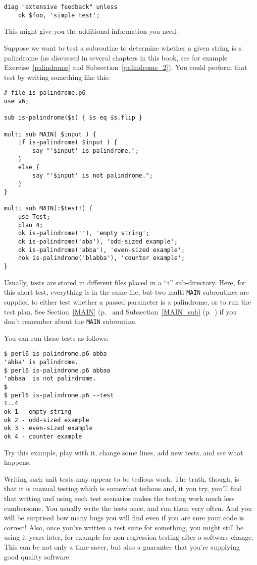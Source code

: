 \begin{verbatim}
diag "extensive feedback" unless
    ok $foo, 'simple test';
\end{verbatim}

This might give you the additional information you need.

Suppose we want to test a subroutine to determine whether a 
given string is a palindrome (as discussed in several chapters 
in this book, see for example Exercise~\ref{palindrome} and 
Subsection~\ref{palindrome_2}). You could perform that test 
by writing something like this:

\begin{verbatim}
# file is-palindrome.p6
use v6;

sub is-palindrome($s) { $s eq $s.flip }

multi sub MAIN( $input ) {
    if is-palindrome( $input ) {
        say "'$input' is palindrome.";
    }
    else {
        say "'$input' is not palindrome.";
    }
}

multi sub MAIN(:$test!) {
    use Test;
    plan 4;
    ok is-palindrome(''), 'empty string';
    ok is-palindrome('aba'), 'odd-sized example';
    ok is-palindrome('abba'), 'even-sized example';
    nok is-palindrome('blabba'), 'counter example';
}
\end{verbatim}

Usually, tests are stored in different files placed in a ``t'' 
sub-directory. Here, for this short test, everything is in the 
same file, but two multi {\tt MAIN} subroutines are supplied 
to either test whether a passed parameter is a palindrome, or to 
run the test plan. See Section~\ref{MAIN} (p.~\pageref{MAIN} 
and Subsection~\ref{MAIN_sub} (p.~\pageref{MAIN_sub})
if you don't remember about the {\tt MAIN} subroutine.

You can run these tests as follows:

\begin{verbatim}
$ perl6 is-palindrome.p6 abba
'abba' is palindrome.
$ perl6 is-palindrome.p6 abbaa
'abbaa' is not palindrome.
$
$ perl6 is-palindrome.p6 --test
1..4
ok 1 - empty string
ok 2 - odd-sized example
ok 3 - even-sized example
ok 4 - counter example
\end{verbatim}

Try this example, play with it, change some lines, add 
new tests, and see what happens.

Writing such unit tests may appear to be tedious work. 
The truth, though, is that it is manual testing which is 
somewhat tedious and, it you try, you'll find that 
writing and using such test scenarios makes the testing 
work much less cumbersome. You usually write the tests 
once, and run them very often. And you will be surprised 
how many bugs you will find even if you are sure your 
code is correct! Also, once you've written 
a test suite for something, you might still be using it 
years later, for example for non-regression testing after 
a software change. This can be not only a time saver, but 
also a guarantee that you're supplying good quality software.

